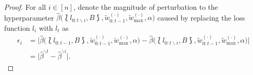 \begin{proof}
For all $i\in[n]$, denote the magnitude of perturbation to the hyperparameter $\hat{\beta}\big(\lbag l_{0:t\backslash i}, B \rbag, \tilde{w}_{0:t-1}^{(\cdot)}, \tilde{w}_{\max}^{(\cdot)}, \alpha\big)$ caused by replacing the loss function $l_i$ with $l_{t}$ as 
\begin{align*}
    \epsilon_i & = \Big|\hat{\beta}\big(\lbag l_{0:t-1}, B \rbag, \tilde{w}_{0:t-1}^{(\cdot)}, \tilde{w}_{\max}^{(\cdot)}, \alpha\big)-\hat{\beta}\big(\lbag l_{0:t\backslash i}, B \rbag, \tilde{w}_{0:t-1}^{(\cdot)}, \tilde{w}_{\max}^{(\cdot)}, \alpha\big)\Big| \\
    & = \Big|\hat{\beta}^{\backslash t}-\hat{\beta}^{\backslash i}\Big|.
\end{align*}








\end{proof}
